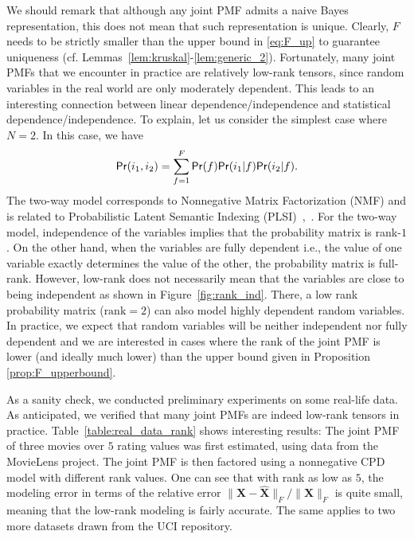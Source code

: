 \documentclass[journal]{IEEEtran}
\begin{document}
We should remark that although any joint PMF admits a naive Bayes representation, this does not mean that such representation is unique. Clearly, $F$ needs to be strictly smaller than the upper bound in \eqref{eq:F_up} to guarantee uniqueness (cf. Lemmas~\ref{lem:kruskal}-\ref{lem:generic_2}). Fortunately, many joint PMFs that we encounter in practice are relatively low-rank tensors, since random variables in the real world are only moderately dependent. This leads to an interesting connection between linear dependence/independence and statistical dependence/independence. To explain, let us consider the simplest case where $N=2$. In this case, we have
\begin{equation}
{\sf Pr}(i_1,i_2) = \sum_{f=1}^F {\sf Pr}(f)  {\sf Pr}(i_1 | f){\sf Pr}(i_2 | f).
\label{eq:pmf_latent_var_2}
\end{equation}
The {two-way model} corresponds to Nonnegative Matrix Factorization (NMF) and is related to Probabilistic Latent Semantic Indexing (PLSI)~\cite{Hofmann1999},~\cite{GaGo2005}. For the {two-way model}, independence of the variables implies that the probability matrix is rank-$1$. On the other hand, when the variables are fully dependent i.e., the value of one variable exactly determines the value of the other, the probability matrix is full-rank. However, low-rank does not necessarily mean that the variables are close to being independent as shown in Figure~\ref{fig:rank_ind}. There, a low rank probability matrix ($\text{rank}=2$) can also model highly dependent random variables. In practice, we expect that random variables will be neither independent nor fully dependent and we are interested in cases where the rank of the joint PMF is lower (and ideally much lower) than the upper bound given in Proposition \ref{prop:F_upperbound}.

As a sanity check, we conducted preliminary experiments on some real-life data. As anticipated, we verified that many joint PMFs are indeed low-rank tensors in practice. Table~\ref{table:real_data_rank} shows interesting results: The joint PMF of three movies over $5$ rating values was first estimated, using data from the MovieLens project. The joint PMF is then factored using a nonnegative CPD model with different rank values. One can see that with rank as low as $5$, the modeling error in terms of the relative error $\| \mathbf{X} - \widehat{\mathbf{X}} \|_F / \| \mathbf{X}\|_F$ is quite small, meaning that the low-rank modeling is fairly accurate. The same applies to two more datasets drawn from the UCI repository. 
\end{document}
